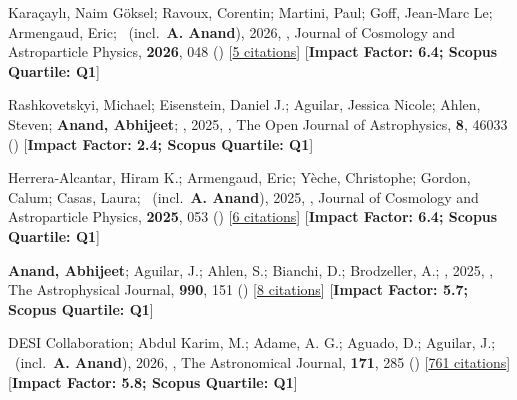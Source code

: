 \item[{\color{numcolor}\scriptsize27}] Kara{\c{c}}ayl{\i}, Naim G{\"o}ksel; Ravoux, Corentin; Martini, Paul; Goff, Jean-Marc Le; Armengaud, Eric; \etal\ (incl.\ \textbf{A. Anand}), 2026, , Journal of Cosmology and Astroparticle Physics, \textbf{2026}, 048 () [\href{https://ui.adsabs.harvard.edu/abs/2026JCAP...04..048K}{5 citations}] [\textbf{Impact Factor: 6.4; Scopus Quartile: Q1}]

\item[{\color{numcolor}\scriptsize26}] Rashkovetskyi, Michael; Eisenstein, Daniel J.; Aguilar, Jessica Nicole; Ahlen, Steven; \textbf{Anand, Abhijeet}; \etal, 2025, , The Open Journal of Astrophysics, \textbf{8}, 46033 () [\textbf{Impact Factor: 2.4; Scopus Quartile: Q1}]

\item[{\color{numcolor}\scriptsize25}] Herrera-Alcantar, Hiram K.; Armengaud, Eric; Y{\`e}che, Christophe; Gordon, Calum; Casas, Laura; \etal\ (incl.\ \textbf{A. Anand}), 2025, , Journal of Cosmology and Astroparticle Physics, \textbf{2025}, 053 () [\href{https://ui.adsabs.harvard.edu/abs/2025JCAP...12..053H}{6 citations}] [\textbf{Impact Factor: 6.4; Scopus Quartile: Q1}]

\item[{\color{numcolor}\scriptsize24}] \textbf{Anand, Abhijeet}; Aguilar, J.; Ahlen, S.; Bianchi, D.; Brodzeller, A.; \etal, 2025, , The Astrophysical Journal, \textbf{990}, 151 () [\href{https://ui.adsabs.harvard.edu/abs/2025ApJ...990..151A}{8 citations}] [\textbf{Impact Factor: 5.7; Scopus Quartile: Q1}]

\item[{\color{numcolor}\scriptsize23}] DESI Collaboration; Abdul Karim, M.; Adame, A. G.; Aguado, D.; Aguilar, J.; \etal\ (incl.\ \textbf{A. Anand}), 2026, , The Astronomical Journal, \textbf{171}, 285 () [\href{https://ui.adsabs.harvard.edu/abs/2026AJ....171..285D}{761 citations}] [\textbf{Impact Factor: 5.8; Scopus Quartile: Q1}]

